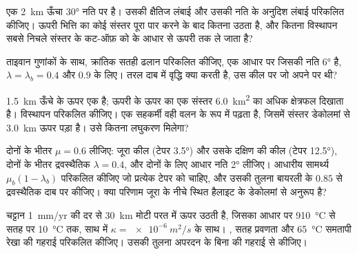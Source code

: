 \begin{exercise}[$\star$]\label{exo:b3:orogenic-wedges:4}
एक \qty{2}{km} ऊँचा  \ang{30} नति पर है। उसकी क्षैतिज लंबाई और उसकी
नति के अनुदिश लंबाई परिकलित कीजिए। ऊपरी भित्ति का कोई संस्तर पूरा  पार
करने के बाद कितना उठता है, और कितना विस्थापन सबसे निचले संस्तर के कट-ऑफ़ को  के आधार से
ऊपरी  तक ले जाता है?
\end{exercise}

\begin{exercise}[$\star\star$]\label{exo:b3:orogenic-wedges:5}
ताइवान गुणांकों के साथ, क्रांतिक सतही ढलान परिकलित कीजिए, एक आधार पर
जिसकी नति \ang{6} है, $\lambda = \lambda_b = 0.4$ और $0.9$ के लिए। तरल दाब में
वृद्धि क्या करती है, उस कील पर जो अपने  पर थी?
\end{exercise}

\begin{exercise}[$\star\star$]\label{exo:b3:orogenic-wedges:6}
\qty{1.5}{km} ऊँचे  के ऊपर एक  है; ऊपरी
 के ऊपर का एक संस्तर \qty{6.0}{km^2} का अधिक क्षेत्रफल दिखाता है। विस्थापन परिकलित कीजिए। एक सहकर्मी
वही वलन  के रूप में पढ़ता है, जिसमें संस्तर डेकोलमां से
\qty{3.0}{km} ऊपर पड़ा है। उसे कितना लघुकरण मिलेगा?
\end{exercise}

\begin{exercise}[$\star\star$]\label{exo:b3:orogenic-wedges:7}
दोनों के भीतर $\mu = 0.6$ लीजिए: जूरा कील (टेपर \ang{3.5}) और उसके दक्षिण की
कील (टेपर \ang{12.5}), दोनों के भीतर द्रवस्थैतिक $\lambda = 0.4$, और
दोनों के लिए आधार नति \ang{2} लीजिए। आधारीय सामर्थ्य $\mu_b(1 -
\lambda_b)$ परिकलित कीजिए जो प्रत्येक टेपर को चाहिए, और उसकी तुलना बायरली के $0.85$ से
द्रवस्थैतिक दाब पर कीजिए। क्या परिणाम जूरा के नीचे स्थित हैलाइट के
डेकोलमां से अनुरूप है?
\end{exercise}

\begin{exercise}[$\star\star$]\label{exo:b3:orogenic-wedges:8}
चट्टान \qty{1}{mm/yr} की दर से \qty{30}{km} मोटी परत में ऊपर उठती है, जिसका
आधार पर \qty{910}{\celsius} से सतह पर \qty{10}{\celsius} तक, साथ में
$\kappa = \qty{e-6}{m^2/s}$ के साथ। , सतह प्रवणता
और \qty{65}{\celsius} समतापी रेखा की गहराई परिकलित कीजिए। उसकी तुलना
अपरदन के बिना की गहराई से कीजिए।
\end{exercise}

